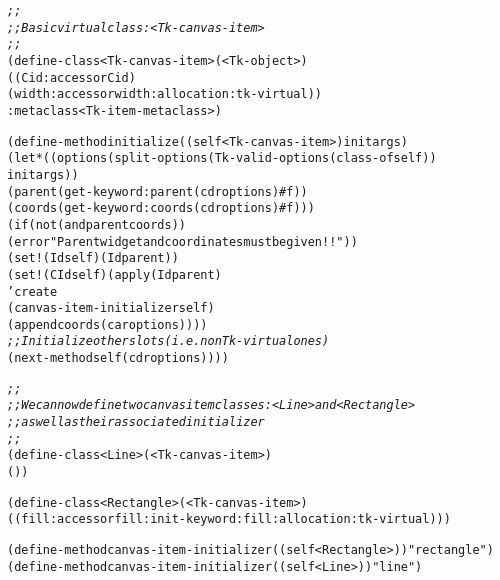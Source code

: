 \begin{alltt}
{\it ;;}
{\it ;; Basic virtual class: {\tt{}<}Tk-canvas-item{\tt{}>} }
{\it ;;}
(define-class {\tt{}<}Tk-canvas-item{\tt{}>} ({\tt{}<}Tk-object{\tt{}>})
  ((Cid :accessor  Cid)
   (width :accessor width :allocation :tk-virtual))
  :metaclass {\tt{}<}Tk-item-metaclass{\tt{}>})


(define-method initialize ((self {\tt{}<}Tk-canvas-item{\tt{}>}) initargs)
  (let* ((options (split-options (Tk-valid-options (class-of self))
                                 initargs))
         (parent  (get-keyword :parent (cdr options) #f))
         (coords  (get-keyword :coords (cdr options) #f)))
    (if (not (and parent coords))
        (error "Parent widget and coordinates must be given!!"))
    (set! (Id  self) (Id parent))
    (set! (CId self) (apply (Id parent) 
                            'create
                            (canvas-item-initializer self)
                            (append coords (car options))))
    {\it ;; Initialize other slots (i.e. non Tk-virtual ones)}
    (next-method self (cdr options))))

{\it ;;}
{\it ;; We can now define two canvas item classes: {\tt{}<}Line{\tt{}>} and {\tt{}<}Rectangle{\tt{}>}}
{\it ;; as well as their associated initializer}
{\it ;;}
(define-class {\tt{}<}Line{\tt{}>}      ({\tt{}<}Tk-canvas-item{\tt{}>})
  ())

(define-class {\tt{}<}Rectangle{\tt{}>} ({\tt{}<}Tk-canvas-item{\tt{}>})
  ((fill  :accessor fill :init-keyword :fill :allocation :tk-virtual)))

(define-method canvas-item-initializer ((self {\tt{}<}Rectangle{\tt{}>})) "rectangle")
(define-method canvas-item-initializer ((self {\tt{}<}Line{\tt{}>}))      "line")
\end{alltt}
